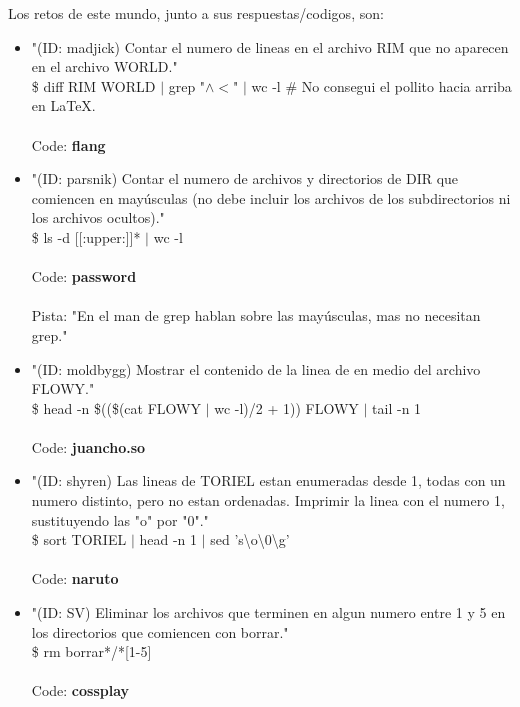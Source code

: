 \documentclass[a4paper,10pt]{article}
\begin{document}
	Los retos de este mundo, junto a sus respuestas/codigos, son:
	
	\begin{itemize}			
		\item "(ID: madjick) Contar el numero de lineas en el archivo RIM que no aparecen en el archivo WORLD."\\
			\$ diff RIM WORLD $|$ grep "$\wedge<$" $|$ wc -l \hspace{0.5cm}\# No consegui el pollito hacia arriba en LaTeX.\\ \\
			Code: \textbf{flang}
			
		\item "(ID: parsnik) Contar el numero de archivos y directorios de DIR que comiencen en may\'usculas (no debe incluir los archivos de los subdirectorios ni los archivos ocultos)."\\
			\$ ls -d [[:upper:]]* $|$ wc -l \\ \\
			Code: \textbf{password} \\ \\
			Pista: "En el man de grep hablan sobre las may\'usculas, mas no necesitan grep."
			
		\item "(ID: moldbygg) Mostrar el contenido de la linea de en medio del archivo FLOWY."\\
			\$ head -n \$((\$(cat FLOWY $|$ wc -l)/2 + 1)) FLOWY $|$ tail -n 1 \\ \\
			Code: \textbf{juancho.so}
			
		\item "(ID: shyren) Las lineas de TORIEL estan enumeradas desde 1, todas con un numero distinto, pero no estan ordenadas. Imprimir la linea con el numero 1, sustituyendo las "o" por "0"."\\
			\$ sort TORIEL $|$ head -n 1 $|$ sed 's\textbackslash o\textbackslash 0\textbackslash g' \\ \\
			Code: \textbf{naruto}
			
		\item "(ID: SV) Eliminar los archivos que terminen en algun numero entre 1 y 5 en los directorios que comiencen con borrar." \\ 
			\$ rm borrar*/*[1-5] \\ \\
			Code: \textbf{cossplay}
	\end{itemize}
	
\end{document}
